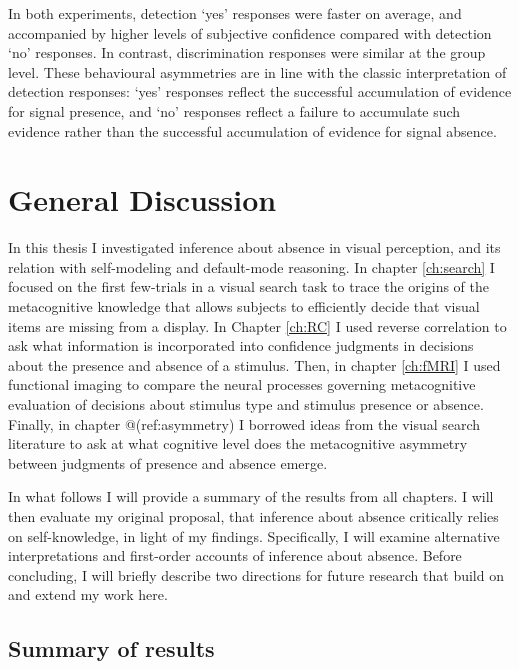 \documentclass[12pt,twoside]{reedthesis}
\begin{document}
In both experiments, detection `yes' responses were faster on average, and accompanied by higher levels of subjective confidence compared with detection `no' responses. In contrast, discrimination responses were similar at the group level. These behavioural asymmetries are in line with the classic interpretation of detection responses: `yes' responses reflect the successful accumulation of evidence for signal presence, and `no' responses reflect a failure to accumulate such evidence rather than the successful accumulation of evidence for signal absence.

\hypertarget{general-discussion}{%
\chapter*{General Discussion}\label{general-discussion}}

In this thesis I investigated inference about absence in visual perception, and its relation with self-modeling and default-mode reasoning. In chapter \ref{ch:search} I focused on the first few-trials in a visual search task to trace the origins of the metacognitive knowledge that allows subjects to efficiently decide that visual items are missing from a display. In Chapter \ref{ch:RC} I used reverse correlation to ask what information is incorporated into confidence judgments in decisions about the presence and absence of a stimulus. Then, in chapter \ref{ch:fMRI} I used functional imaging to compare the neural processes governing metacognitive evaluation of decisions about stimulus type and stimulus presence or absence. Finally, in chapter @(ref:asymmetry) I borrowed ideas from the visual search literature to ask at what cognitive level does the metacognitive asymmetry between judgments of presence and absence emerge.

In what follows I will provide a summary of the results from all chapters. I will then evaluate my original proposal, that inference about absence critically relies on self-knowledge, in light of my findings. Specifically, I will examine alternative interpretations and first-order accounts of inference about absence. Before concluding, I will briefly describe two directions for future research that build on and extend my work here.

\hypertarget{summary-of-results}{%
\section{Summary of results}\label{summary-of-results}}
\end{document}
